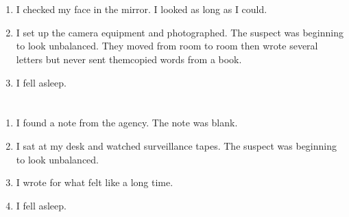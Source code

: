 \documentclass{article}
\begin{document}
    \newpage
    
    \section{}
    
    \begin{enumerate}
    
    \item I checked my face in the mirror. I looked as long as I could.\\
    
    \item I set up the camera equipment and photographed. The suspect was beginning to look unbalanced. They moved from room to room then wrote several letters but never sent themcopied words from a book.\\
    
    \item I fell asleep.\\
    
    \end{enumerate}
     
    \newpage
    
    \section{}
    
    \begin{enumerate}
    
    \item I found a note from the agency. The note was blank.\\
    
    \item I sat at my desk and watched surveillance tapes. The suspect was beginning to look unbalanced.\\
    
    \item I wrote for what felt like a long time.\\
    
    \item I fell asleep.\\
    
    \end{enumerate}
     
    \newpage
    
    \section{}
    
\end{document}
